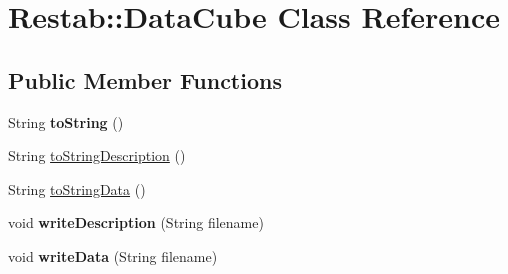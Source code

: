 \hypertarget{classRestab_1_1DataCube}{
\section{Restab::DataCube Class Reference}
\label{classRestab_1_1DataCube}
}
\subsection*{Public Member Functions}
\begin{DoxyCompactItemize}
\item 
\hypertarget{classRestab_1_1DataCube_ab96289de1962f4f6892c213f6f6be5ba}{
String {\bfseries toString} ()}
\label{classRestab_1_1DataCube_ab96289de1962f4f6892c213f6f6be5ba}

\item 
String \hyperlink{classRestab_1_1DataCube_a1f3b93599231f3ca13294453d5ed3f66}{toStringDescription} ()
\item 
String \hyperlink{classRestab_1_1DataCube_ab60df8cf202f561a6b7c18582c4921b5}{toStringData} ()
\item 
\hypertarget{classRestab_1_1DataCube_ab18372eec12a286ac5a6e0c95c31a91a}{
void {\bfseries writeDescription} (String filename)}
\label{classRestab_1_1DataCube_ab18372eec12a286ac5a6e0c95c31a91a}

\item 
\hypertarget{classRestab_1_1DataCube_a3e61dc87a23d9fadce6d92598af59963}{
void {\bfseries writeData} (String filename)}
\label{classRestab_1_1DataCube_a3e61dc87a23d9fadce6d92598af59963}

\end{DoxyCompactItemize}

